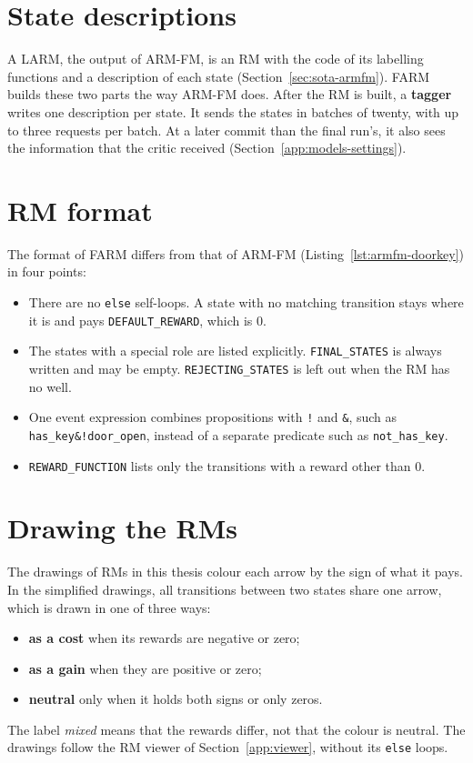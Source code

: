 \documentclass[11pt,english,listoffigures,listoftables]{tfgetsinf}
\begin{document}
\section{State descriptions}
A LARM, the output of ARM-FM, is an RM with the code of its labelling functions and a description of each state (Section~\ref{sec:sota-armfm}). FARM builds these two parts the way ARM-FM does. After the RM is built, a \textbf{tagger} writes one description per state. It sends the states in batches of twenty, with up to three requests per batch. At a later commit than the final run's, it also sees the information that the critic received (Section~\ref{app:models-settings}).

\section{RM format}
The format of FARM differs from that of ARM-FM (Listing~\ref{lst:armfm-doorkey}) in four points:
\begin{itemize}
    \item There are no \texttt{else} self-loops. A state with no matching transition stays where it is and pays \texttt{DEFAULT\_REWARD}, which is 0.
    \item The states with a special role are listed explicitly. \texttt{FINAL\_\allowbreak STATES} is always written and may be empty. \texttt{REJECTING\_\allowbreak STATES} is left out when the RM has no well.
    \item One event expression combines propositions with \texttt{!} and \texttt{\&}, such as \texttt{has\_key\&\allowbreak !door\_open}, instead of a separate predicate such as \texttt{not\_has\_key}.
    \item \texttt{REWARD\_FUNCTION} lists only the transitions with a reward other than 0.
\end{itemize}

\section{Drawing the RMs}
\label{app:drawing}
The drawings of RMs in this thesis colour each arrow by the sign of what it pays. In the simplified drawings, all transitions between two states share one arrow, which is drawn in one of three ways:
\begin{itemize}
    \item \textbf{as a cost} when its rewards are negative or zero;
    \item \textbf{as a gain} when they are positive or zero;
    \item \textbf{neutral} only when it holds both signs or only zeros.
\end{itemize}
The label \textit{mixed} means that the rewards differ, not that the colour is neutral. The drawings follow the RM viewer of Section~\ref{app:viewer}, without its \texttt{else} loops.
\end{document}
